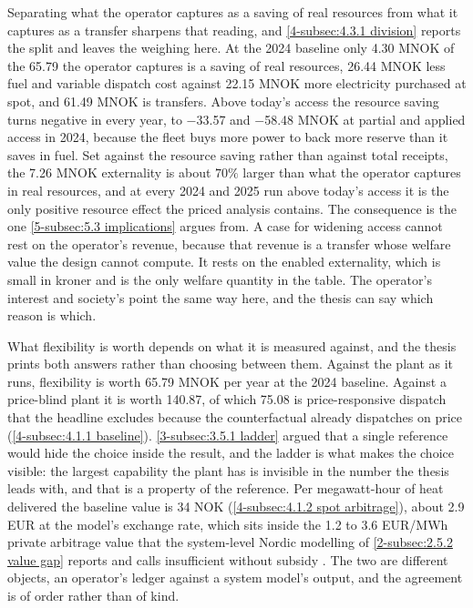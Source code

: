 Separating what the operator captures as a saving of real resources from what it captures as a transfer sharpens that reading, and \autoref{4-subsec:4.3.1 division} reports the split and leaves the weighing here. At the 2024 baseline only 4.30 MNOK of the 65.79 the operator captures is a saving of real resources, 26.44 MNOK less fuel and variable dispatch cost against 22.15 MNOK more electricity purchased at spot, and 61.49 MNOK is transfers. Above today's access the resource saving turns negative in every year, to $-$33.57 and $-$58.48 MNOK at partial and applied access in 2024, because the fleet buys more power to back more reserve than it saves in fuel. Set against the resource saving rather than against total receipts, the 7.26 MNOK externality is about $70\%$ larger than what the operator captures in real resources, and at every 2024 and 2025 run above today's access it is the only positive resource effect the priced analysis contains. The consequence is the one \autoref{5-subsec:5.3 implications} argues from. A case for widening access cannot rest on the operator's revenue, because that revenue is a transfer whose welfare value the design cannot compute. It rests on the enabled externality, which is small in kroner and is the only welfare quantity in the table. The operator's interest and society's point the same way here, and the thesis can say which reason is which.

What flexibility is worth depends on what it is measured against, and the thesis prints both answers rather than choosing between them. Against the plant as it runs, flexibility is worth 65.79 MNOK per year at the 2024 baseline. Against a price-blind plant it is worth 140.87, of which 75.08 is price-responsive dispatch that the headline excludes because the counterfactual already dispatches on price (\autoref{4-subsec:4.1.1 baseline}). \autoref{3-subsec:3.5.1 ladder} argued that a single reference would hide the choice inside the result, and the ladder is what makes the choice visible: the largest capability the plant has is invisible in the number the thesis leads with, and that is a property of the reference. Per megawatt-hour of heat delivered the baseline value is 34 NOK (\autoref{4-subsec:4.1.2 spot arbitrage}), about 2.9 EUR at the model's exchange rate, which sits inside the 1.2 to 3.6 EUR/MWh private arbitrage value that the system-level Nordic modelling of \autoref{2-subsec:2.5.2 value gap} reports and calls insufficient without subsidy \cite{nagel_european_2023}. The two are different objects, an operator's ledger against a system model's output, and the agreement is of order rather than of kind.

